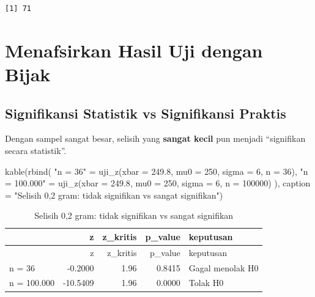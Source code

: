 \documentclass[
  indonesian,
  letterpaper,
]{book}
\newenvironment{Shaded}{\begin{snugshade}}{\end{snugshade}}
\newcommand{\AttributeTok}[1]{\textcolor[rgb]{0.40,0.45,0.13}{#1}}
\newcommand{\DecValTok}[1]{\textcolor[rgb]{0.68,0.00,0.00}{#1}}
\newcommand{\FloatTok}[1]{\textcolor[rgb]{0.68,0.00,0.00}{#1}}
\newcommand{\FunctionTok}[1]{\textcolor[rgb]{0.28,0.35,0.67}{#1}}
\newcommand{\NormalTok}[1]{\textcolor[rgb]{0.00,0.23,0.31}{#1}}
\newcommand{\OtherTok}[1]{\textcolor[rgb]{0.00,0.23,0.31}{#1}}
\newcommand{\StringTok}[1]{\textcolor[rgb]{0.13,0.47,0.30}{#1}}
\begin{document}
\begin{verbatim}
[1] 71
\end{verbatim}

\section{Menafsirkan Hasil Uji dengan
Bijak}\label{menafsirkan-hasil-uji-dengan-bijak}

\subsection{Signifikansi Statistik vs Signifikansi
Praktis}\label{signifikansi-statistik-vs-signifikansi-praktis}

Dengan sampel sangat besar, selisih yang \textbf{sangat kecil} pun
menjadi ``signifikan secara statistik''.

\begin{Shaded}
\begin{Highlighting}[]
\FunctionTok{kable}\NormalTok{(}\FunctionTok{rbind}\NormalTok{(}
  \StringTok{"n = 36"}      \OtherTok{=} \FunctionTok{uji\_z}\NormalTok{(}\AttributeTok{xbar =} \FloatTok{249.8}\NormalTok{, }\AttributeTok{mu0 =} \DecValTok{250}\NormalTok{, }\AttributeTok{sigma =} \DecValTok{6}\NormalTok{, }\AttributeTok{n =} \DecValTok{36}\NormalTok{),}
  \StringTok{"n = 100.000"} \OtherTok{=} \FunctionTok{uji\_z}\NormalTok{(}\AttributeTok{xbar =} \FloatTok{249.8}\NormalTok{, }\AttributeTok{mu0 =} \DecValTok{250}\NormalTok{, }\AttributeTok{sigma =} \DecValTok{6}\NormalTok{, }\AttributeTok{n =} \DecValTok{100000}\NormalTok{)}
\NormalTok{), }\AttributeTok{caption =} \StringTok{"Selisih 0,2 gram: tidak signifikan vs sangat signifikan"}\NormalTok{)}
\end{Highlighting}
\end{Shaded}

\begin{longtable}[]{@{}lrrrl@{}}
\caption{Selisih 0,2 gram: tidak signifikan vs sangat
signifikan}\tabularnewline
\toprule\noalign{}
& z & z\_kritis & p\_value & keputusan \\
\midrule\noalign{}
\endfirsthead
\toprule\noalign{}
& z & z\_kritis & p\_value & keputusan \\
\midrule\noalign{}
\endhead
\bottomrule\noalign{}
\endlastfoot
n = 36 & -0.2000 & 1.96 & 0.8415 & Gagal menolak H0 \\
n = 100.000 & -10.5409 & 1.96 & 0.0000 & Tolak H0 \\
\end{longtable}
\end{document}

